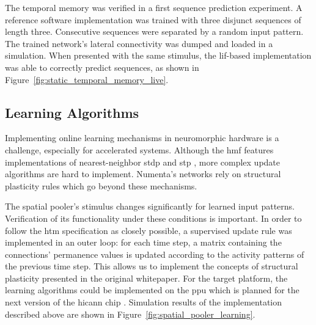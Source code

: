 
The temporal memory was verified in a first sequence prediction
experiment. A reference software implementation was trained with three disjunct
sequences of length three. Consecutive sequences were separated by a random
input pattern. The trained network's lateral connectivity was dumped and loaded
in a simulation. When presented with the same stimulus, the \gls{lif}-based
implementation was able to correctly predict sequences, as shown in
Figure~\ref{fig:static_temporal_memory_live}.

\begin{figure*}[p]
	\begin{center}
		
	\end{center}
	\caption{A \gls{lif} neuron based temporal memory implementation correctly predicting different patterns. Predicted cells are marked blue, active cells in purple. The network spans 128 columns with each of their eight \gls{htm} cells collecting distal stimuli via two dendritic segments. Connectivity for the distal inputs was configured externally. The model was presented three disjunct sequences of size three. The individual patterns were separated by a random input \gls{sdr}.}
	\label{fig:static_temporal_memory_live}
\end{figure*}

\subsection{Learning Algorithms}

Implementing online learning mechanisms in neuromorphic hardware is a challenge,
especially for accelerated systems. Although the \gls{hmf} features
implementations of nearest-neighbor \gls{stdp} and \gls{stp}
\citep{friedmann13plasticity,billaudelle14stp}, more complex update algorithms
are hard to implement. Numenta's networks rely on structural
plasticity rules which go beyond these mechanisms.

The spatial pooler's stimulus changes significantly for learned input patterns.
Verification of its functionality under these conditions is important. In order
to follow the \gls{htm} specification as closely possible, a supervised update
rule was implemented in an outer loop: for each time step, a matrix containing
the connections' permanence values is updated according to the activity patterns
of the previous time step. This allows us to implement the concepts of
structural plasticity presented in the original whitepaper. For the target
platform, the learning algorithms could be implemented on the \gls{ppu} which is
planned for the next version of the \gls{hicann} chip \citep{friedmann2013phd}.
Simulation results of the implementation described above are shown in
Figure~\ref{fig:spatial_pooler_learning}.


